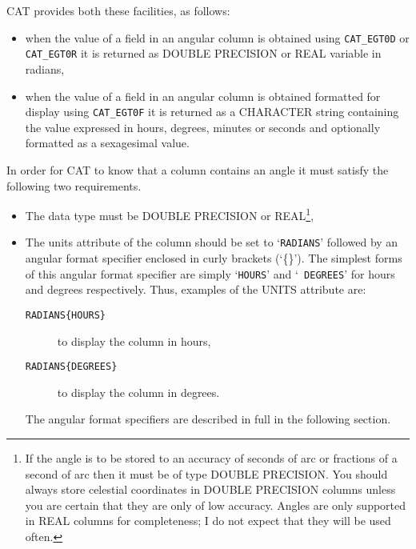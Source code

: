 CAT provides both these facilities, as follows:

\begin{itemize}

  \item when the value of a field in an angular column is 
   obtained using {\tt CAT\_EGT0D} or {\tt CAT\_EGT0R} it is 
   returned as DOUBLE PRECISION or REAL variable in radians,

  \item when the value of a field in an angular column is 
   obtained formatted for display using {\tt CAT\_EGT0F} it is 
   returned as a CHARACTER string containing the value expressed in 
   hours, degrees, minutes or seconds and optionally formatted as a
   sexagesimal value.

\end{itemize}

In order for CAT to know that a column contains an angle it must 
satisfy the following two requirements.

\begin{itemize}

  \item The data type must be DOUBLE PRECISION or 
   REAL\footnote{If the angle is to be stored to an accuracy of 
   seconds of arc or fractions of a second of arc then it must be 
   of type DOUBLE PRECISION. You should always store celestial 
   coordinates in DOUBLE PRECISION columns unless you are certain 
   that they are only of low accuracy. Angles are only supported in 
   REAL columns for completeness; I do not expect that they will be 
   used often.},

  \item The units attribute of the column should be set to 
   `{\tt RADIANS}' followed by an angular format specifier 
   enclosed in curly brackets (`\{\}'). The simplest forms of this 
   angular format specifier are simply `{\tt HOURS}' and `{\tt 
   DEGREES}' for hours and degrees respectively. Thus, examples of 
   the UNITS attribute are:

  \begin{description}

    \item[{\tt RADIANS\{HOURS\}}] to display the column in hours,

    \item[{\tt RADIANS\{DEGREES\}}] to display the column in degrees.

  \end{description}

   The angular format specifiers are described in full in the following
   section.

\end{itemize}

